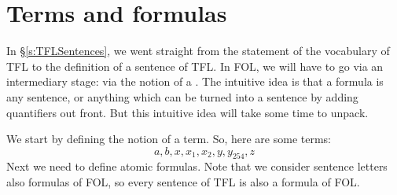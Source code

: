 \section{Terms and formulas}
\label{s:TermsFormulas}

In \S\ref{s:TFLSentences}, we went straight from the statement of the vocabulary of TFL to the definition of a sentence of TFL. In FOL, we will have to go via an intermediary stage: via the notion of a . The intuitive idea is that a formula is any sentence, or anything which can be turned into a sentence by adding quantifiers out front. But this intuitive idea will take some time to unpack.

We start by defining the notion of a term.
So, here are some terms:
	$$a, b, x, x_1, x_2, y, y_{254}, z$$
Next we need to define atomic formulas.
Note that we consider sentence letters also formulas of FOL, so every sentence of TFL is also a formula of FOL.




